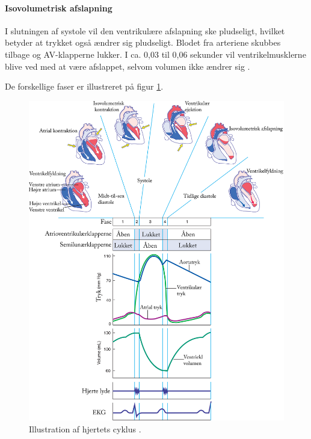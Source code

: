 \paragraph*{Isovolumetrisk afslapning}
I slutningen af systole vil den ventrikulære afslapning ske pludseligt, hvilket betyder at trykket også ændrer sig pludseligt. Blodet fra arteriene skubbes tilbage og AV-klapperne lukker. I ca. 0,03 til 0,06 sekunder vil ventrikelmusklerne blive ved med at være  afslappet, selvom volumen ikke ændrer sig \cite{guyton} \cite{cindy} \cite{gronanatomi}. 

\noindent De forskellige faser er illustreret på figur \ref{fig:hjerte_cyklus}.\\


\begin{figure}[H] %
\begin{center}
\includegraphics[width=1\textwidth]{figures/cyklus}
\end{center} 
\caption{Illustration af hjertets cyklus \cite{cindy}.}
\label{fig:hjerte_cyklus}
\end{figure}


